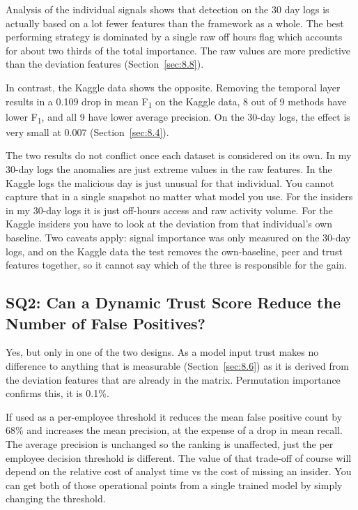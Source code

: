 \documentclass[a4paper,12pt]{article}
\begin{document}
Analysis of the individual signals shows that detection on the 30 day logs is actually based on a lot fewer features than the framework as a whole. The best performing strategy is dominated by a single raw off hours flag which accounts for about two thirds of the total importance. The raw values are more predictive than the deviation features (Section~\ref{sec:8.8}).

In contrast, the Kaggle data shows the opposite. Removing the temporal layer results in a 0.109 drop in mean F\textsubscript{1} on the Kaggle data, 8 out of 9 methods have lower F\textsubscript{1}, and all 9 have lower average precision. On the 30-day logs, the effect is very small at 0.007 (Section~\ref{sec:8.4}).

The two results do not conflict once each dataset is considered on its own. In my 30-day logs the anomalies are just extreme values in the raw features. In the Kaggle logs the malicious day is just unusual for that individual. You cannot capture that in a single snapshot no matter what model you use. For the insiders in my 30-day logs it is just off-hours access and raw activity volume. For the Kaggle insiders you have to look at the deviation from that individual's own baseline. Two caveats apply: signal importance was only measured on the 30-day logs, and on the Kaggle data the test removes the own-baseline, peer and trust features together, so it cannot say which of the three is responsible for the gain.

\subsection{SQ2: Can a Dynamic Trust Score Reduce the Number of False Positives?}
\label{sec:9.2}

Yes, but only in one of the two designs. As a model input trust makes no difference to anything that is measurable (Section~\ref{sec:8.6}) as it is derived from the deviation features that are already in the matrix. Permutation importance confirms this, it is 0.1\%.

If used as a per-employee threshold it reduces the mean false positive count by 68\% and increases the mean precision, at the expense of a drop in mean recall. The average precision is unchanged so the ranking is unaffected, just the per employee decision threshold is different. The value of that trade-off of course will depend on the relative cost of analyst time vs the cost of missing an insider. You can get both of those operational points from a single trained model by simply changing the threshold.
\end{document}

